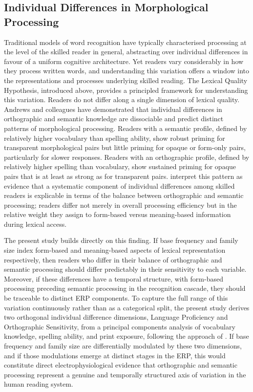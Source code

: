 \documentclass[utf8]{FrontiersinHarvard} %
\begin{document}
	
	\subsection{Individual Differences in Morphological Processing}
	
	Traditional models of word recognition have typically characterised processing at the level of the skilled reader in general, abstracting over individual differences in favour of a uniform cognitive architecture. Yet readers vary considerably in how they process written words, and understanding this variation offers a window into the representations and processes underlying skilled reading. The Lexical Quality Hypothesis, introduced above, provides a principled framework for understanding this variation. Readers do not differ along a single dimension of lexical quality. Andrews and colleagues  \citep{andrewsIndividualDifferencesSkilled2012, andrewsMorphologicalPrimingStronger2013} have demonstrated that individual differences in orthographic and semantic knowledge are dissociable and predict distinct patterns of morphological processing. Readers with a semantic profile, defined by relatively higher vocabulary than spelling ability, show robust priming for transparent morphological pairs but little priming for opaque or form-only pairs, particularly for slower responses. Readers with an orthographic profile, defined by relatively higher spelling than vocabulary, show sustained priming for opaque pairs that is at least as strong as for transparent pairs. \citet{andrewsMorphologicalPrimingStronger2013} interpret this pattern as evidence that a systematic component of individual differences among skilled readers is explicable in terms of the balance between orthographic and semantic processing; readers differ not merely in overall processing efficiency but in the relative weight they assign to form-based versus meaning-based information during lexical access.
	
	The present study builds directly on this finding. If base frequency and family size index form-based and meaning-based aspects of lexical representation respectively, then readers who differ in their balance of orthographic and semantic processing should differ predictably in their sensitivity to each variable. Moreover, if these differences have a temporal structure, with form-based processing preceding semantic processing in the recognition cascade, they should be traceable to distinct ERP components. To capture the full range of this variation continuously rather than as a categorical split, the present study derives two orthogonal individual difference dimensions, Language Proficiency and Orthographic Sensitivity, from a principal components analysis of vocabulary knowledge, spelling ability, and print exposure, following the approach of \citet{andrewsMorphologicalPrimingStronger2013}. If base frequency and family size are differentially modulated by these two dimensions, and if those modulations emerge at distinct stages in the ERP, this would constitute direct electrophysiological evidence that orthographic and semantic processing represent a genuine and temporally structured axis of variation in the human reading system.
	
\end{document}
